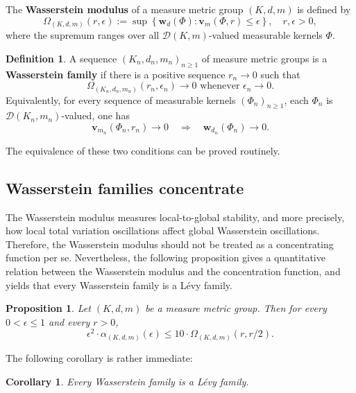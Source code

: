 \documentclass{amsart}
\providecommand{\definitionname}{Definition}
\numberwithin{equation}{subsection}
\theoremstyle{plain}
\newtheorem{prop}[prop]{Proposition}
\newtheorem{cor}[cor]{Corollary}
\theoremstyle{definition}
\newtheorem{defn}[defn]{\protect\definitionname}
\theoremstyle{plain}
\begin{document}
\smallskip

The {\bf Wasserstein modulus} of a measure metric group \(\left(K,d,m\right)\) is defined by
\[\Omega_{\left(K,d,m\right)}\left(r,\epsilon\right):=\sup\left\{\mathbf{w}_{d}\left(\Phi\right):\mathbf{v}_{m}\left(\Phi,r\right)\leq\epsilon\right\},\quad r,\epsilon>0,\]
where the supremum ranges over all \(\mathcal{D}\left(K,m\right)\)-valued measurable kernels \(\Phi\).

\begin{defn}
A sequence \(\left(K_{n},d_{n},m_{n}\right)_{n\geq1}\) of measure metric groups is a {\bf Wasserstein family} if there is a positive sequence \(r_{n}\to0\) such that
\[\Omega_{\left(K_{n},d_{n},m_{n}\right)}\left(r_{n},\epsilon_{n}\right)\to0\text{ whenever }\epsilon_{n}\to0.\]
Equivalently, for every sequence of measurable kernels \(\left(\Phi_{n}\right)_{n\geq 1}\), each \(\Phi_{n}\) is \(\mathcal{D}\left(K_{n},m_{n}\right)\)-valued, one has
\[\mathbf{v}_{m_{n}}\left(\Phi_{n},r_{n}\right)\to0\quad\Longrightarrow\quad \mathbf{w}_{d_{n}}\left(\Phi_{n}\right)\to0.\]
\end{defn}

The equivalence of these two conditions can be proved routinely.

\subsection{Wasserstein families concentrate}

The Wasserstein modulus measures local-to-global stability, and more precisely, how local total variation oscillations affect global Wasserstein oscillations. Therefore, the Wasserstein modulus should not be treated as a concentrating function per se. Nevertheless, the following proposition gives a quantitative relation between the Wasserstein modulus and the concentration function, and yields that every Wasserstein family is a L\'{e}vy family.

\begin{prop}\label{prop:WassControlsLevy}
Let \(\left(K,d,m\right)\) be a measure metric group. Then for every \(0<\epsilon\leq1\) and every \(r>0\),
\[\epsilon^{2}\cdot\alpha_{\left(K,d,m\right)}\left(\epsilon\right)\leq10\cdot\Omega_{\left(K,d,m\right)}\left(r,r/2\right).\]
\end{prop}

The following corollary is rather immediate:

\begin{cor}\label{cor:WassisLevy}
Every Wasserstein family is a L\'{e}vy family.
\end{cor}
\end{document}
